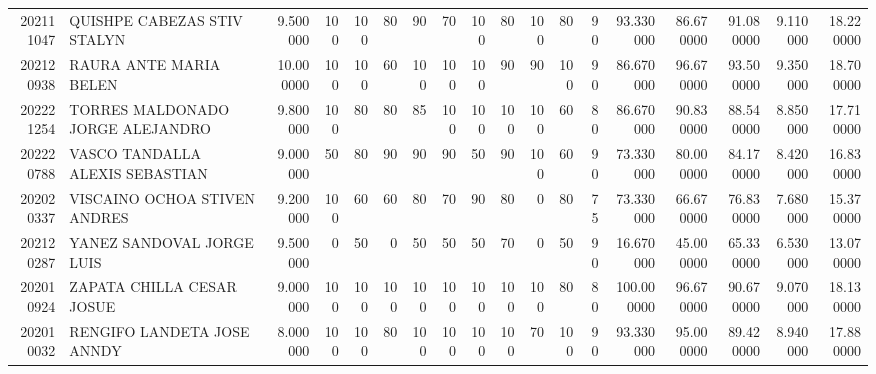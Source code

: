 \begin{tabular}{rlrrrrrrrrrrrrrrrr}
202111047 & QUISHPE CABEZAS STIV STALYN & 9.500000 & 100 & 100 & 80 & 90 & 70 & 100 & 80 & 100 & 80 & 90 & 93.330000 & 86.670000 & 91.080000 & 9.110000 & 18.220000 \\
202120938 & RAURA ANTE MARIA BELEN & 10.000000 & 100 & 100 & 60 & 100 & 100 & 100 & 90 & 90 & 100 & 90 & 86.670000 & 96.670000 & 93.500000 & 9.350000 & 18.700000 \\
202221254 & TORRES MALDONADO JORGE ALEJANDRO & 9.800000 & 100 & 80 & 80 & 85 & 100 & 100 & 100 & 100 & 60 & 80 & 86.670000 & 90.830000 & 88.540000 & 8.850000 & 17.710000 \\
202220788 & VASCO TANDALLA ALEXIS SEBASTIAN & 9.000000 & 50 & 80 & 90 & 90 & 90 & 50 & 90 & 100 & 60 & 90 & 73.330000 & 80.000000 & 84.170000 & 8.420000 & 16.830000 \\
202020337 & VISCAINO OCHOA STIVEN ANDRES & 9.200000 & 100 & 60 & 60 & 80 & 70 & 90 & 80 & 0 & 80 & 75 & 73.330000 & 66.670000 & 76.830000 & 7.680000 & 15.370000 \\
202120287 & YANEZ SANDOVAL JORGE LUIS & 9.500000 & 0 & 50 & 0 & 50 & 50 & 50 & 70 & 0 & 50 & 90 & 16.670000 & 45.000000 & 65.330000 & 6.530000 & 13.070000 \\
202010924 & ZAPATA CHILLA CESAR JOSUE & 9.000000 & 100 & 100 & 100 & 100 & 100 & 100 & 100 & 100 & 80 & 80 & 100.000000 & 96.670000 & 90.670000 & 9.070000 & 18.130000 \\
202010032 & RENGIFO LANDETA JOSE ANNDY & 8.000000 & 100 & 100 & 80 & 100 & 100 & 100 & 100 & 70 & 100 & 90 & 93.330000 & 95.000000 & 89.420000 & 8.940000 & 17.880000 \\
\bottomrule
\end{tabular}
